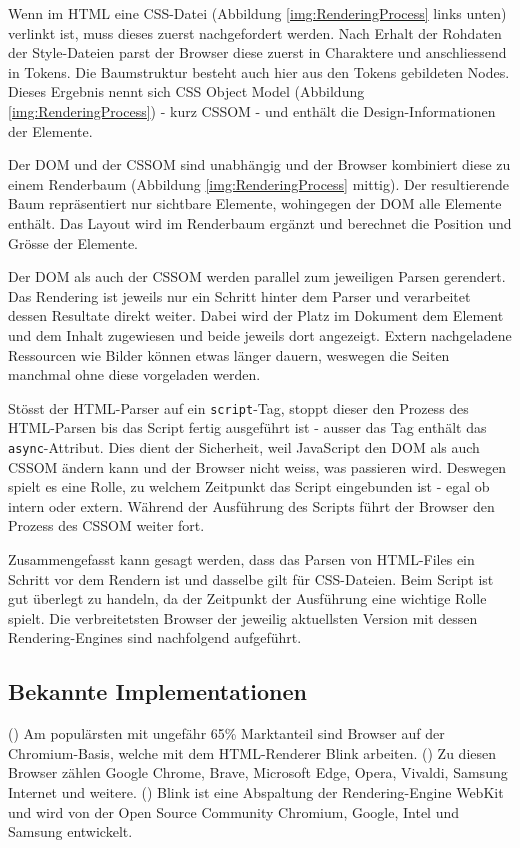 Wenn im HTML eine CSS-Datei (Abbildung \ref{img:RenderingProcess} links unten) verlinkt ist, muss dieses zuerst nachgefordert werden.
Nach Erhalt der Rohdaten der Style-Dateien parst der Browser diese zuerst in Charaktere und anschliessend in Tokens.
Die Baumstruktur besteht auch hier aus den Tokens gebildeten Nodes. 
Dieses Ergebnis nennt sich CSS Object Model (Abbildung \ref{img:RenderingProcess}) - kurz CSSOM - und enthält die Design-Informationen der Elemente.

Der DOM und der CSSOM sind unabhängig und der Browser kombiniert diese zu einem Renderbaum (Abbildung \ref{img:RenderingProcess} mittig).
Der resultierende Baum repräsentiert nur sichtbare Elemente, wohingegen der DOM alle Elemente enthält.
Das Layout wird im Renderbaum ergänzt und berechnet die Position und Grösse der Elemente.

Der DOM als auch der CSSOM werden parallel zum jeweiligen Parsen gerendert.
Das Rendering ist jeweils nur ein Schritt hinter dem Parser und verarbeitet dessen Resultate direkt weiter.
Dabei wird der Platz im Dokument dem Element und dem Inhalt zugewiesen und beide jeweils dort angezeigt. %
Extern nachgeladene Ressourcen wie Bilder können etwas länger dauern, weswegen die Seiten manchmal ohne diese vorgeladen werden.

Stösst der HTML-Parser auf ein \texttt{script}-Tag, stoppt dieser den Prozess des HTML-Parsen bis das Script fertig ausgeführt ist - ausser das Tag enthält das \texttt{async}-Attribut.
Dies dient der Sicherheit, weil JavaScript den DOM als auch CSSOM ändern kann und der Browser nicht weiss, was passieren wird.
Deswegen spielt es eine Rolle, zu welchem Zeitpunkt das Script eingebunden ist - egal ob intern oder extern. 
Während der Ausführung des Scripts führt der Browser den Prozess des CSSOM weiter fort.

Zusammengefasst kann gesagt werden, dass das Parsen von HTML-Files ein Schritt vor dem Rendern ist und dasselbe gilt für CSS-Dateien. 
Beim Script ist gut überlegt zu handeln, da der Zeitpunkt der Ausführung eine wichtige Rolle spielt.
Die verbreitetsten Browser der jeweilig aktuellsten Version mit dessen Rendering-Engines sind nachfolgend aufgeführt.


\subsection{Bekannte Implementationen}
\label{sec:implementationsRenderer}

(\cite{blinkRenderer}) Am populärsten mit ungefähr 65\% Marktanteil sind Browser auf der Chromium-Basis, welche mit dem HTML-Renderer Blink arbeiten. 
(\cite{chromiumBrowser}) Zu diesen Browser zählen Google Chrome, Brave, Microsoft Edge, Opera, Vivaldi, Samsung Internet und weitere.
(\cite{blinkRenderer}) Blink ist eine Abspaltung der Rendering-Engine WebKit und wird von der Open Source Community Chromium, Google, Intel und Samsung entwickelt.

